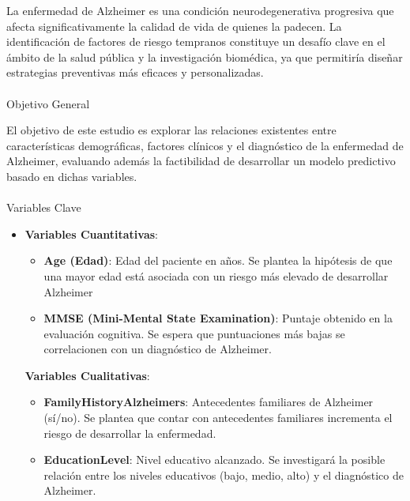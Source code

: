 \documentclass[
  letterpaper,
  DIV=11,
  numbers=noendperiod]{scrartcl}
\makeatletter
\let\oldparagraph\paragraph
\renewcommand{\paragraph}{
    \@ifstar
      \xxxParagraphStar
      \xxxParagraphNoStar
  }
\newcommand{\xxxParagraphStar}[1]{\oldparagraph*{#1}\mbox{}}
\newcommand{\xxxParagraphNoStar}[1]{\oldparagraph{#1}\mbox{}}
\makeatother
\begin{document}
La enfermedad de Alzheimer es una condición neurodegenerativa progresiva
que afecta significativamente la calidad de vida de quienes la padecen.
La identificación de factores de riesgo tempranos constituye un desafío
clave en el ámbito de la salud pública y la investigación biomédica, ya
que permitiría diseñar estrategias preventivas más eficaces y
personalizadas.

\paragraph{Objetivo General}\label{objetivo-general}

El objetivo de este estudio es explorar las relaciones existentes entre
características demográficas, factores clínicos y el diagnóstico de la
enfermedad de Alzheimer, evaluando además la factibilidad de desarrollar
un modelo predictivo basado en dichas variables.

\paragraph{Variables Clave}\label{variables-clave}

\begin{itemize}
\item
  \textbf{Variables Cuantitativas}:

  \begin{itemize}
  \item
    \textbf{Age (Edad)}: Edad del paciente en años. Se plantea la
    hipótesis de que una mayor edad está asociada con un riesgo más
    elevado de desarrollar Alzheimer
  \item
    \textbf{MMSE (Mini-Mental State Examination)}: Puntaje obtenido en
    la evaluación cognitiva. Se espera que puntuaciones más bajas se
    correlacionen con un diagnóstico de Alzheimer.
  \end{itemize}

  \textbf{Variables Cualitativas}:

  \begin{itemize}
  \item
    \textbf{FamilyHistoryAlzheimers}: Antecedentes familiares de
    Alzheimer (sí/no). Se plantea que contar con antecedentes familiares
    incrementa el riesgo de desarrollar la enfermedad.
  \item
    \textbf{EducationLevel}: Nivel educativo alcanzado. Se investigará
    la posible relación entre los niveles educativos (bajo, medio, alto)
    y el diagnóstico de Alzheimer.
  \end{itemize}
\end{itemize}
\end{document}
